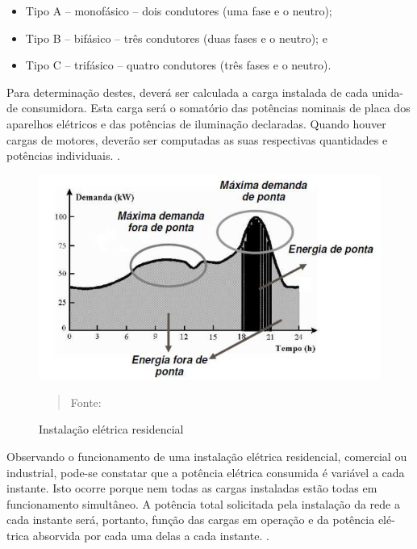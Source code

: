 \begin{itemize}
    \item Tipo A -- monofásico – dois condutores (uma fase e o neutro);
    \item Tipo B -- bifásico – três condutores (duas fases e o neutro); e
    \item Tipo C -- trifásico – quatro condutores (três fases e o neutro).
\end{itemize}

Para determinação destes, deverá ser calculada a carga instalada de cada unida-
de consumidora. Esta carga será o somatório das potências nominais de placa
dos aparelhos elétricos e das potências de iluminação declaradas.
Quando houver cargas de motores, deverão ser computadas as suas respectivas
quantidades e potências individuais. \cite{procel}.

\begin{figure}[!htb]
\begin{center}
			\caption{ Instalação elétrica residencial}

\includegraphics[width=.9\textwidth]{Figuras/ponta.png}
            \vspace*{\fill} 
            \begin{quote} 
            \centering 
            Fonte: \cite{procel}
            \end{quote}
            \vspace*{\fill}
			\label{fig:instres}
\end{center}
\end{figure}

Observando o funcionamento de uma instalação elétrica residencial, comercial
ou industrial, pode-se constatar que a potência elétrica consumida é variável a
cada instante. Isto ocorre porque nem todas as cargas instaladas estão todas em
funcionamento simultâneo. A potência total solicitada pela instalação da rede a
cada instante será, portanto, função das cargas em operação e da potência elé-
trica absorvida por cada uma delas a cada instante. \cite{procel}.

